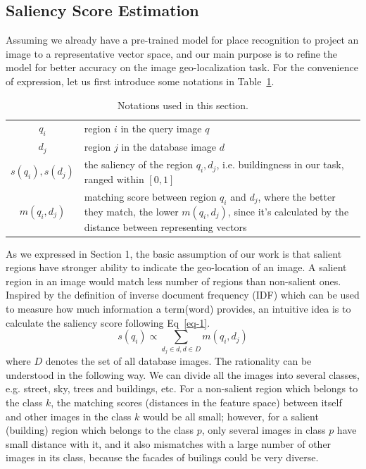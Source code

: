 \subsection{Saliency Score Estimation}
\par
Assuming we already have a pre-trained model for place recognition to project an image to a representative vector space, and our main purpose is to refine the model for better accuracy on the image geo-localization task. For the convenience of expression, let us first introduce some notations in Table~\ref{table:notations}. 
\begin{table}[htbp]
\begin{center}
\begin{tabular}{|c|p{}|}
\hline
$q_i$ & region $i$ in the query image $q$\\[0.2cm]
$d_j$ & region $j$ in the database image $d$\\[0.2cm]
$s(q_i), s(d_j)$ & the saliency of the region $q_i, d_j$, i.e. buildingness in our
task, ranged within $[0,1]$ \\[0.2cm]
$m(q_i, d_j)$ & matching score between region $q_i$ and $d_j$, where the better they match, the lower $m(q_i,d_j)$, since it's calculated by the distance between representing vectors\\[0.2cm]
\hline
\end{tabular}
\end{center}
\caption{Notations used in this section.}
\label{table:notations}
\end{table}
\par
As we expressed in Section 1, the basic assumption of our work is that salient regions have stronger ability to indicate the geo-location of an image. A salient region in an image would match less number of regions than non-salient ones. Inspired by the definition of inverse document frequency (IDF) which can be used to measure how much information a term(word) provides, an intuitive idea is to calculate the saliency score following Eq~\eqref{eq-1}.
\begin{equation}
s(q_i) \propto \sum_{d_j \in d, d \in D} m(q_i, d_j)
\label{eq-1}
\end{equation}
where $D$ denotes the set of all database images. The rationality can be understood in the following way. We can divide all the images into several classes, e.g. street, sky, trees and buildings, etc. For a non-salient region which belongs to the class $k$, the matching scores (distances in the feature space) between itself and other images in the class $k$ would be all small; however, for a salient (building) region which belongs to the class $p$, only several images in class $p$ have small distance with it, and it also mismatches with a large number of other images in its class, because the facades of builings could be very diverse. 
